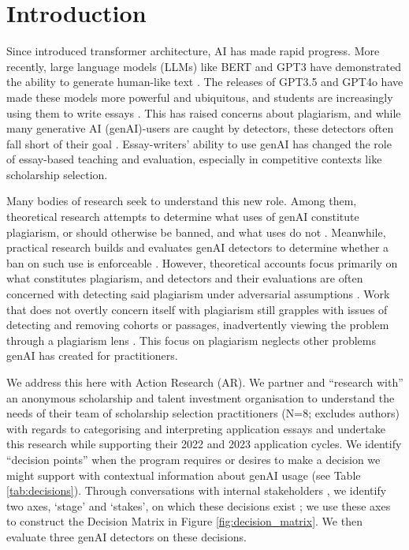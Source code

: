 \section{Introduction}\label{sec:intro}
Since \textcite{ashish_vaswani_attention_2017} introduced transformer architecture, AI has made rapid progress. More recently, large language models (LLMs) like BERT and GPT3 have demonstrated the ability to generate human-like text \cite{jacob_devlin_bert_2018,brown_language_2020}. The releases of GPT3.5 and GPT4o have made these models more powerful and ubiquitous, and students are increasingly using them to write essays \cite{openai_gpt-4_2023,dehouche_plagiarism_2021}. This has raised concerns about plagiarism, and while many generative AI (genAI)-users are caught by detectors, these detectors often fall short of their goal \cite{liang_gpt_2023,kalpesh_krishna_paraphrasing_2023,mitchell_detectgpt_2023,tharindu_kumarage_stylometric_2023,dehouche_plagiarism_2021}. Essay-writers' ability to use genAI has changed the role of essay-based teaching and evaluation, especially in competitive contexts like scholarship selection.

Many bodies of research seek to understand this new role. Among them, theoretical research attempts to determine what uses of genAI constitute plagiarism, or should otherwise be banned, and what uses do not \cite{yu_huang_reflection_2023,mike_perkins_decoding_2023}. Meanwhile, practical research builds and evaluates genAI detectors to determine whether a ban on such use is enforceable \cite{mitchell_detectgpt_2023,tharindu_kumarage_stylometric_2023,kalpesh_krishna_paraphrasing_2023}. However, theoretical accounts focus primarily on what constitutes plagiarism, and detectors and their evaluations are often concerned with detecting said plagiarism under adversarial assumptions \cite{yu_huang_reflection_2023,kalpesh_krishna_paraphrasing_2023}. Work that does not overtly concern itself with plagiarism still grapples with issues of detecting and removing cohorts or passages, inadvertently viewing the problem through a plagiarism lens \cite{mitchell_detectgpt_2023,liang_gpt_2023}. This focus on plagiarism neglects other problems genAI has created for practitioners.

We address this here with Action Research (AR). We partner and ``research with'' \cite{bradbury_action_2003} an anonymous scholarship and talent investment organisation to understand the needs of their team of scholarship selection practitioners (N=8; excludes authors) with regards to categorising and interpreting application essays and undertake this research while supporting their 2022 and 2023 application cycles. We identify ``decision points'' when the program requires or desires to make a decision we might support with contextual information about genAI usage (see Table \ref{tab:decisions}). Through conversations with internal stakeholders \cite{Hayes_2011}, we identify two axes, `stage' and `stakes', on which these decisions exist \cite{braun_using_2006}; we use these axes to construct the Decision Matrix in Figure \ref{fig:decision_matrix}. We then evaluate three genAI detectors on these decisions.

